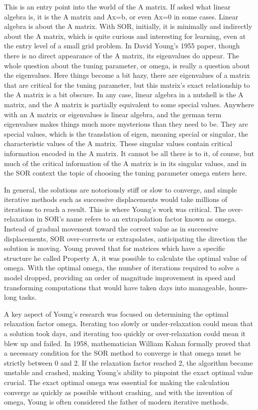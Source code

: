 This is an entry point into the world of the A matrix. If asked what linear algebra is, it is the A matrix and Ax=b, or even Ax=0 in some cases. Linear algebra is about the A matrix. With SOR, initially, it is minimally and indirectly about the A matrix, which is quite curious and interesting for learning, even at the entry level of a small grid problem. In David Young's 1955 paper, though there is no direct appearance of the A matrix, its eigenvalues do appear. The whole question about the tuning parameter, or omega, is really a question about the eigenvalues. Here things become a bit hazy, there are eigenvalues of a matrix that are critical for the tuning parameter, but this matrix's exact relationship to the A matrix is a bit obscure. In any case, linear algebra in a nutshell is the A matrix, and the A matrix is partially equivalent to some special values. Anywhere with an A matrix or eigenvalues is linear algebra, and the german term eigenvalues makes things much more mysterious than they need to be. They are special values, which is the translation of eigen, meaning special or singular, the characteristic values of the A matrix. These singular values contain critical information encoded in the A matrix. It cannot be all there is to it, of course, but much of the critical information of the A matrix is in its singular values, and in the SOR context the topic of choosing the tuning parameter omega enters here.

In general, the solutions are notoriously stiff or slow to converge, and simple iterative methods such as successive displacements would take millions of iterations to reach a result. This is where Young's work was critical. The over-relaxation in SOR’s name refers to an extrapolation factor known as omega. Instead of gradual movement toward the correct value as in successive displacements, SOR over-corrects or extrapolates, anticipating the direction the solution is moving. Young proved that for matrices which have a specific structure he called Property A, it was possible to calculate the optimal value of omega. With the optimal omega, the number of iterations required to solve a model dropped, providing an order of magnitude improvement in speed and transforming computations that would have taken days into manageable, hours-long tasks.

A key aspect of Young’s research was focused on determining the optimal relaxation factor omega. Iterating too slowly or under-relaxation could mean that a solution took days, and iterating too quickly or over-relaxation could mean it blew up and failed. In 1958, mathematician William Kahan formally proved that a necessary condition for the SOR method to converge is that omega must be strictly between 0 and 2. If the relaxation factor reached 2, the algorithm became unstable and crashed, making Young's ability to pinpoint the exact optimal value crucial. The exact optimal omega was essential for making the calculation converge as quickly as possible without crashing, and with the invention of omega, Young is often considered the father of modern iterative methods. 


